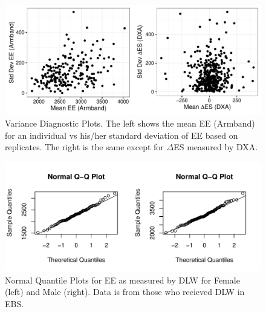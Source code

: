 \documentclass[11pt]{article}\usepackage[]{graphicx}\usepackage[]{color}
\makeatletter
\def\maxwidth{ %
  \ifdim\Gin@nat@width>\linewidth
    \linewidth
  \else
    \Gin@nat@width
  \fi
}
\newenvironment{knitrout}{}{} %
\makeatother
\begin{document}
\begin{knitrout}
\color{fgcolor}\begin{figure}

{\centering \includegraphics[width=\maxwidth]{figure/ebsdiag-1} 

}

\caption[Variance Diagnostic Plots]{Variance Diagnostic Plots. The left shows the mean EE (Armband) for an individual vs his/her standard deviation of EE based on replicates. The right is the same except for $\Delta$ES measured by DXA.}\label{fig:ebsdiag}
\end{figure}


\end{knitrout}


\begin{knitrout}
\color{fgcolor}\begin{figure}

{\centering \includegraphics[width=\maxwidth]{figure/ebsdiag2-1} 

}

\caption[Normal Quantile Plots for EE as measured by DLW for Female (left) and Male (right)]{Normal Quantile Plots for EE as measured by DLW for Female (left) and Male (right). Data is from those who recieved DLW in EBS.}\label{fig:ebsdiag2}
\end{figure}


\end{knitrout}
\end{document}
